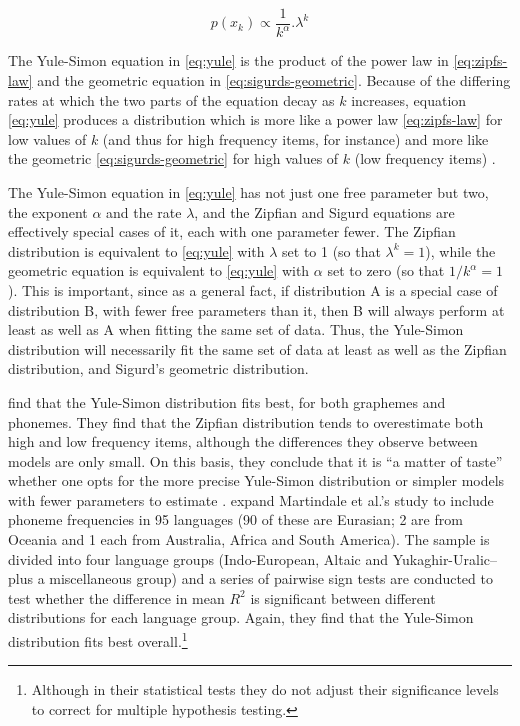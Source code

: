 \begin{equation}
p(x_k) \propto \frac{1}{k^\alpha}.\lambda^k
\label{eq:yule}
\end{equation}

The Yule-Simon equation in \eqref{eq:yule} is the product of the power law in \eqref{eq:zipfs-law} and the geometric equation in \eqref{eq:sigurds-geometric}. Because of the differing rates at which the two parts of the equation decay as \(k\) increases, equation \eqref{eq:yule} produces a distribution which is more like a power law \eqref{eq:zipfs-law} for low values of \(k\) (and thus for high frequency items, for instance) and more like the geometric \eqref{eq:sigurds-geometric} for high values of \(k\) (low frequency items) \autocite{simon_class_1955}.

The Yule-Simon equation in \eqref{eq:yule} has not just one free parameter but two, the exponent \(\alpha\) and the rate \(\lambda\), and the Zipfian and Sigurd equations are effectively special cases of it, each with one parameter fewer. The Zipfian distribution is equivalent to \eqref{eq:yule} with \(\lambda\) set to 1 (so that \(\lambda^k = 1\)), while the geometric equation is equivalent to \eqref{eq:yule} with \(\alpha\) set to zero (so that \(1/k^\alpha = 1\)). This is important, since as a general fact, if distribution A is a special case of distribution B, with fewer free parameters than it, then B will always perform at least as well as A when fitting the same set of data. Thus, the Yule-Simon distribution will necessarily fit the same set of data at least as well as the Zipfian distribution, and Sigurd's geometric distribution.

\textcite{martindale_comparison_1996} find that the Yule-Simon distribution fits best, for both graphemes and phonemes. They find that the Zipfian distribution tends to overestimate both high and low frequency items, although the differences they observe between models are only small. On this basis, they conclude that it is ``a matter of taste'' whether one opts for the more precise Yule-Simon distribution or simpler models with fewer parameters to estimate \autocite[p.~111]{martindale_comparison_1996}. \textcite{tambovtsev_phoneme_2007} expand Martindale et al.'s \autocite*{martindale_comparison_1996} study to include phoneme frequencies in 95 languages (90 of these are Eurasian; 2 are from Oceania and 1 each from Australia, Africa and South America). The sample is divided into four language groups (Indo-European, Altaic and Yukaghir-Uralic--plus a miscellaneous group) and a series of pairwise sign tests are conducted to test whether the difference in mean \(R^2\) is significant between different distributions for each language group. Again, they find that the Yule-Simon distribution fits best overall.\footnote{Although in their statistical tests they do not adjust their significance levels to correct for multiple hypothesis testing.}

